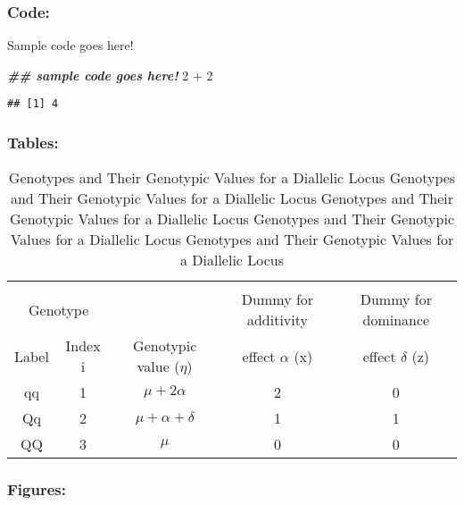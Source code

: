 \documentclass[11pt]{asaproc}
\newenvironment{Shaded}{\begin{snugshade}}{\end{snugshade}}
\newcommand{\DecValTok}[1]{\textcolor[rgb]{0.00,0.00,0.81}{#1}}
\newcommand{\DocumentationTok}[1]{\textcolor[rgb]{0.56,0.35,0.01}{\textbf{\textit{#1}}}}
\newcommand{\SpecialCharTok}[1]{\textcolor[rgb]{0.00,0.00,0.00}{#1}}
\begin{document}
\hypertarget{code}{%
\subsubsection{Code:}\label{code}}

Sample code goes here!

\begin{Shaded}
\begin{Highlighting}[]
\DocumentationTok{\#\# sample code goes here!}
\DecValTok{2} \SpecialCharTok{+} \DecValTok{2}
\end{Highlighting}
\end{Shaded}

\begin{verbatim}
## [1] 4
\end{verbatim}

\hypertarget{tables}{%
\subsubsection{Tables:}\label{tables}}

\begin{table}
\caption{Genotypes and Their Genotypic Values for a Diallelic Locus Genotypes and Their Genotypic Values for a Diallelic Locus Genotypes and Their Genotypic Values for a Diallelic Locus Genotypes and Their Genotypic Values for a Diallelic Locus Genotypes and Their Genotypic Values for a Diallelic Locus }
\begin{center}
\begin{tabular}{ccccc}
\hline
\hline
\\[-5pt]
\multicolumn{2}{c}{Genotype} & &
\multicolumn{1}{c}{Dummy for additivity} &
\multicolumn{1}{c}{Dummy for dominance }\\
\multicolumn{1}{c}{Label} &    
\multicolumn{1}{c}{Index i} &
\multicolumn{1}{c}{Genotypic value ($\eta$)}&
\multicolumn{1}{c}{effect $\alpha$ (x)} &
\multicolumn{1}{c}{effect $\delta$ (z)}\\
\hline
qq      &1&     $\mu + \mbox{2}\alpha$  & 2&    0\\
Qq&     2&      $\mu + \alpha + \delta$&        1       &1\\
QQ&     3&      $\mu$ &  0&      0\\
\hline
\end{tabular}
\end{center}
\end{table}

\hypertarget{figures}{%
\subsubsection{Figures:}\label{figures}}
\end{document}
